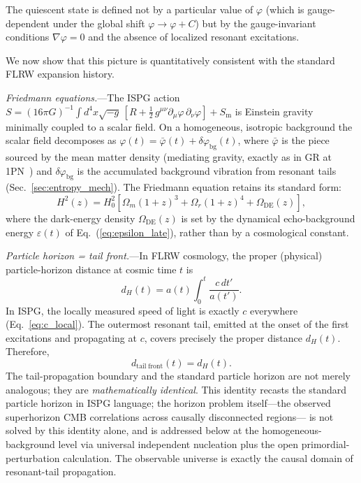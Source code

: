 \documentclass[aps,prd,onecolumn,superscriptaddress,nofootinbib,showpacs,12pt,notitlepage]{revtex4-2}
\begin{document}
The quiescent state is defined not by a particular value
of $\varphi$ (which is gauge-dependent under the global
shift $\varphi \to \varphi + C$) but by the
gauge-invariant conditions $\nabla\varphi = 0$ and
the absence of localized resonant excitations.

We now show that this picture is quantitatively
consistent with the standard FLRW expansion history.

\textit{Friedmann equations.}---The ISPG action
$S = (16\pi G)^{-1}\!\int d^4x\sqrt{-g}\,[R +
\frac{1}{2}\,g^{\mu\nu}\partial_\mu\varphi\,
\partial_\nu\varphi] + S_{\mathrm{m}}$
is Einstein gravity minimally coupled to a scalar
field.  On a homogeneous, isotropic background the
scalar field decomposes as $\varphi(t) = \bar\varphi(t)
+ \delta\varphi_{\mathrm{bg}}(t)$, where $\bar\varphi$
is the piece sourced by the mean matter density (mediating
gravity, exactly as in GR at 1PN~\cite{Lotishvili2026})
and $\delta\varphi_{\mathrm{bg}}$ is the accumulated
background vibration from resonant tails
(Sec.~\ref{sec:entropy_mech}).  The Friedmann equation
retains its standard form:
\begin{equation}\label{eq:friedmann_ispg}
  H^{2}(z) = H_0^{2}\!\left[\Omega_m(1+z)^{3}
    + \Omega_r(1+z)^{4}
    + \Omega_{\mathrm{DE}}(z)\right],
\end{equation}
where the dark-energy density $\Omega_{\mathrm{DE}}(z)$
is set by the dynamical echo-background energy
$\varepsilon(t)$ of Eq.~(\ref{eq:epsilon_late}),
rather than by a cosmological constant.

\textit{Particle horizon = tail front.}---In FLRW
cosmology, the proper (physical) particle-horizon
distance at cosmic time $t$ is
\begin{equation}\label{eq:particle_horizon}
  d_H(t) = a(t)\int_0^{t}\frac{c\,dt'}{a(t')}.
\end{equation}
In ISPG, the locally measured speed of light is
exactly $c$ everywhere (Eq.~\ref{eq:c_local}).
The outermost resonant tail, emitted at the onset
of the first excitations and propagating at $c$,
covers precisely the proper distance
$d_H(t)$.  Therefore,
\begin{equation}\label{eq:tail_horizon}
  \boxed{
  d_{\mathrm{tail\;front}}(t) = d_H(t).
  }
\end{equation}
The tail-propagation boundary and the standard
particle horizon are not merely analogous;
they are \emph{mathematically identical}.  This identity
recasts the standard particle horizon in ISPG language;
the horizon problem itself---the observed superhorizon
CMB correlations across causally disconnected regions---
is not solved by this identity alone, and is addressed
below at the homogeneous-background level via universal
independent nucleation plus the open primordial-
perturbation calculation.  The
observable universe is exactly the causal domain
of resonant-tail propagation.
\end{document}
